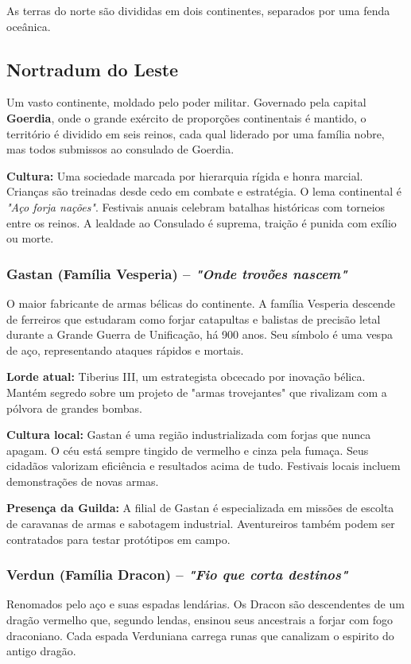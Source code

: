 
As terras do norte são divididas em dois continentes, separados por uma fenda oceânica.

\subsection*{Nortradum do Leste}
Um vasto continente, moldado pelo poder militar. Governado pela capital \textbf{Goerdia}, onde o grande exército de proporções continentais é mantido, o território é dividido em seis reinos, cada qual liderado por uma família nobre, mas todos submissos ao consulado de Goerdia.

\textbf{\ringmfamily Cultura:} Uma sociedade marcada por hierarquia rígida e honra marcial. Crianças são treinadas desde cedo em combate e estratégia. O lema continental é \textit{"Aço forja nações"}. Festivais anuais celebram batalhas históricas com torneios entre os reinos. A lealdade ao Consulado é suprema, traição é punida com exílio ou morte.

\subsubsection*{Gastan (Família Vesperia) – \textit{"Onde trovões nascem"}}
O maior fabricante de armas bélicas do continente. A família Vesperia descende de ferreiros que estudaram como forjar catapultas e balistas de precisão letal durante a Grande Guerra de Unificação, há 900 anos. Seu símbolo é uma vespa de aço, representando ataques rápidos e mortais.

\textbf{\ringmfamily Lorde atual:} Tiberius   III, um estrategista obcecado por inovação bélica. Mantém segredo sobre um projeto de "armas trovejantes" que rivalizam com a pólvora de grandes bombas.

\textbf{\ringmfamily Cultura local:} Gastan é uma região industrializada com forjas que nunca apagam. O céu está sempre tingido de vermelho e cinza pela fumaça. Seus cidadãos valorizam eficiência e resultados acima de tudo. Festivais locais incluem demonstrações de novas armas.

\textbf{\ringmfamily Presença da Guilda:} A filial de Gastan é especializada em missões de escolta de caravanas de armas e sabotagem industrial. Aventureiros também podem ser contratados para testar protótipos em campo.

\subsubsection*{Verdun (Família Dracon) – \textit{"Fio que corta destinos"}}
Renomados pelo aço e suas espadas lendárias. Os Dracon são descendentes de um dragão vermelho que, segundo lendas, ensinou seus ancestrais a forjar com fogo draconiano. Cada espada Verduniana carrega runas que canalizam o espirito do antigo dragão.

